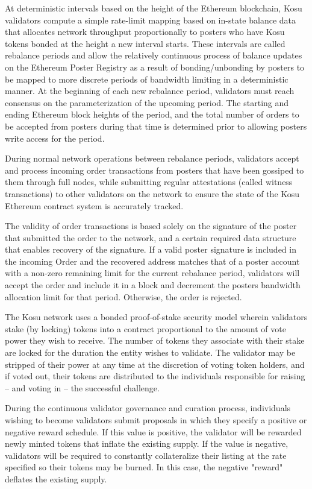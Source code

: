 \documentclass[10pt]{article}
\begin{document}
At deterministic intervals based on the height of the Ethereum blockchain, Kosu validators compute a simple rate-limit mapping based on in-state balance data that allocates network throughput proportionally to posters who have Kosu tokens bonded at the height a new interval starts. These intervals are called rebalance periods and allow the relatively continuous process of balance updates on the Ethereum Poster Registry as a result of bonding/unbonding by posters to be mapped to more discrete periods of bandwidth limiting in a deterministic manner. At the beginning of each new rebalance period, validators must reach consensus on the parameterization of the upcoming period. The starting and ending Ethereum block heights of the period, and the total number of orders to be accepted from posters during that time is determined prior to allowing posters write access for the period.
\medskip

During normal network operations between rebalance periods, validators accept and process incoming order transactions from posters that have been gossiped to them through full nodes, while submitting regular attestations (called witness transactions) to other validators on the network to ensure the state of the Kosu Ethereum contract system is accurately tracked.
\medskip

The validity of order transactions is based solely on the signature of the poster that submitted the order to the network, and a certain required data structure that enables recovery of the signature. If a valid poster signature is included in the incoming Order and the recovered address matches that of a poster account with a non-zero remaining limit for the current rebalance period, validators will accept the order and include it in a block and decrement the posters bandwidth allocation limit for that period. Otherwise, the order is rejected.
\medskip

The Kosu network uses a bonded proof-of-stake security model wherein validators stake (by locking) tokens into a contract proportional to the amount of vote power they wish to receive. The number of tokens they associate with their stake are locked for the duration the entity wishes to validate. The validator may be stripped of their power at any time at the discretion of voting token holders, and if voted out, their tokens are distributed to the individuals responsible for raising – and voting in – the successful challenge. 
\medskip

During the continuous validator governance and curation process, individuals wishing to become validators submit proposals in which they specify a positive or negative reward schedule. If this value is positive, the validator will be rewarded newly minted tokens that inflate the existing supply. If the value is negative, validators will be required to constantly collateralize their listing at the rate specified so their tokens may be burned. In this case, the negative "reward" deflates the existing supply. 
\medskip
\end{document}
